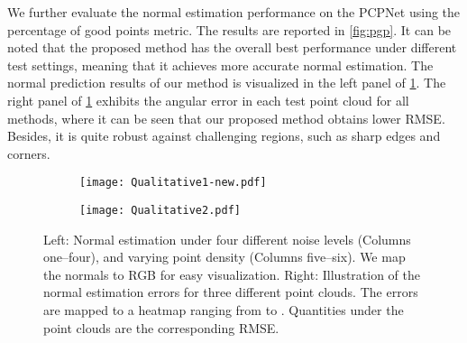 \documentclass[runningheads]{llncs}
\begin{document}
We further evaluate the normal estimation performance on the PCPNet using the percentage of good points  metric. The results are reported in \cref{fig:pgp}. It can be noted that the proposed
method has the overall best performance under different test settings, meaning that it achieves more accurate normal estimation. The normal prediction results of our method is visualized in the left panel of \cref{fig:quali1}. The right panel of \cref{fig:quali1} exhibits the angular error in each test point cloud for all methods, where it can be seen that our proposed method obtains lower RMSE. Besides, it is quite robust against challenging regions, such as sharp edges and corners.

\begin{figure}[t]
  \centering
  \begin{subfigure}{0.485\linewidth}
    \texttt{[image: Qualitative1-new.pdf]}
\end{subfigure}
  \begin{subfigure}{0.493\linewidth}
    \texttt{[image: Qualitative2.pdf]}
\end{subfigure}
    \caption{Left: Normal estimation under four different
noise levels (Columns one--four), and varying point density (Columns
five--six). We map the normals to RGB for easy visualization. Right: Illustration of the normal estimation errors for three different point clouds. The errors are mapped to a heatmap ranging from  to . Quantities under the point clouds are the corresponding RMSE.}
    \label{fig:quali1}
\end{figure}
\begin{table}[t]
\centering
\caption{Statistics of the angle RMSE on the real-world SceneNN dataset~\cite{hua-pointwise-cvpr18}.}
\label{tab:scenenn}
\end{table}
\end{document}
